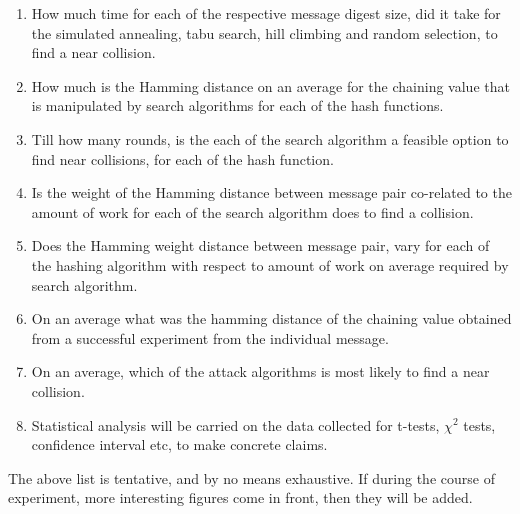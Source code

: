 \documentclass[12pt]{artikel3}                  %
\begin{document}
\begin{enumerate}
  \item How much time for each of the respective message digest size, did it take for the simulated
  annealing, tabu search, hill climbing and random selection, to find a near collision.
  \item How much is the Hamming distance on an average for the chaining value that is manipulated by
  search algorithms for each of the hash functions.
  \item Till how many rounds, is the each of the search algorithm a feasible option to find near 
  collisions, for each of the hash function.
  \item Is the weight of the Hamming distance between message pair co-related to the amount of work
  for each of the search algorithm does to find a collision.
  \item Does the Hamming weight distance between message pair, vary for each of the hashing algorithm
  with respect to amount of work on average required by search algorithm.
  \item On an average what was the hamming distance of the chaining value obtained from a successful
  experiment from the individual message.
  \item On an average, which of the attack algorithms is most likely to find a near collision.
  \item Statistical analysis will be carried on the data collected for t-tests, $\chi^{2}$ tests,
  confidence interval etc, to make concrete claims.
\end{enumerate}

The above list is tentative, and by no means exhaustive. If during the course of experiment, more 
interesting figures come in front, then they will be added.



\end{document}
